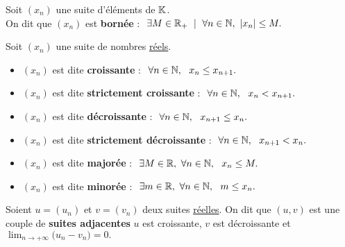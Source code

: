 \newpage

Soit $(x_n)$ une suite d'éléments de $\mathbb{K}$.\\
On dit que $(x_n)$ est \textbf{bornée} \ssi : \(\ \exists M\in \mathbb{R}_+ \ \mid \ \forall n\in \mathbb{N},\ |x_n|\leq M. \)

\vspace{1.2cm}

\noindent Soit $(x_n)$ une suite de nombres \underline{réels}.\vspace{0.1cm}
\begin{itemize}[leftmargin=1cm, label=•]
    \item $(x_n)$ est dite \textbf{croissante} \ssi : \(\ \forall n\in \NN,\ \ x_n \leq x_{n+1}.  \)\vspace{0.1cm}
    
    \item $(x_n)$ est dite \textbf{strictement croissante} \ssi : \(\ \forall n\in \mathbb{N},\ \ x_n < x_{n+1}.  \)\vspace{0.1cm}

    \item $(x_n)$ est dite \textbf{décroissante} \ssi : \(\ \forall n\in \NN,\ \ x_{n+1} \leq x_n.  \)\vspace{0.1cm}
    
    \item $(x_n)$ est dite \textbf{strictement décroissante} \ssi : \(\ \forall n\in \mathbb{N},\ \ x_{n+1} < x_n.  \)\vspace{0.1cm}

    \item $(x_n)$ est dite \textbf{majorée} \ssi : \(\ \exists M\in \mathbb{R},\ \forall n\in \mathbb{N},\ \ x_n \leq M.  \)\vspace{0.1cm}

    \item $(x_n)$ est dite \textbf{minorée} \ssi : \(\ \exists m\in \mathbb{R},\ \forall n\in \mathbb{N},\ \ m\leq x_n .  \)
\end{itemize}

\vspace{1.3cm}

Soient $u=(u_n)$ et $v=(v_n)$ deux suites \underline{réelles}. On dit que \((u,v)\) est une couple de \textbf{suites adjacentes} \ssi $u$ est croissante, $v$ est décroissante et \(\displaystyle \lim_{n\to+\infty} \bigl(u_n-v_n\bigr)=0.\)


